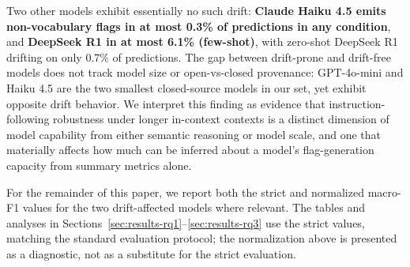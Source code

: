 Two other models exhibit essentially no such drift: \textbf{Claude
Haiku 4.5 emits non-vocabulary flags in at most 0.3\% of predictions
in any condition}, and \textbf{DeepSeek R1 in at most 6.1\% (few-shot)},
with zero-shot DeepSeek R1 drifting on only 0.7\% of predictions.
The gap between drift-prone and drift-free models does not track
model size or open-vs-closed provenance: GPT-4o-mini and Haiku 4.5
are the two smallest closed-source models in our set, yet exhibit
opposite drift behavior.  We interpret this finding as evidence that
instruction-following robustness under longer in-context contexts is
a distinct dimension of model capability from either semantic
reasoning or model scale, and one that materially affects how much
can be inferred about a model's flag-generation capacity from summary
metrics alone.

For the remainder of this paper, we report both the strict and
normalized macro-F1 values for the two drift-affected models where
relevant.  The tables and analyses in
Sections~\ref{sec:results-rq1}--\ref{sec:results-rq3} use the strict
values, matching the standard evaluation protocol; the normalization
above is presented as a diagnostic, not as a substitute for the
strict evaluation.
